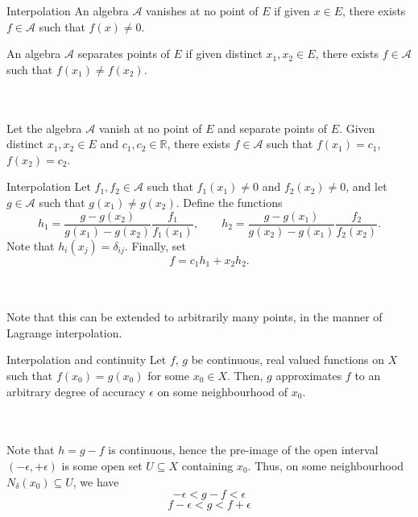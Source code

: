 \documentclass{beamer}
\def\R{\mathbb{R}}
\begin{document}
    \begin{frame}{Interpolation}
        An algebra $\mathscr{A}$ vanishes at no point of $E$ if given $x \in E$,
        there exists $f \in \mathscr{A}$ such that $f(x) \neq 0$.

        An algebra $\mathscr{A}$ separates points of $E$ if given distinct $x_1, x_2
        \in E$, there exists $f \in \mathscr{A}$ such that $f(x_1) \neq f(x_2)$.

        \\~\\

        Let the algebra $\mathscr{A}$ vanish at no point of $E$ and separate
        points of $E$. Given distinct $x_1, x_2 \in E$ and $c_1, c_2 \in \R$, there
        exists $f \in \mathscr{A}$ such that $f(x_1) = c_1$, $f(x_2) = c_2$.
    \end{frame}

    \begin{frame}{Interpolation}
        Let $f_1, f_2 \in \mathscr{A}$ such that $f_1(x_1) \neq 0$ and $f_2(x_2) \neq
        0$, and let $g \in \mathscr{A}$ such that $g(x_1) \neq g(x_2)$. Define the
        functions \[
            h_1 = \frac{g - g(x_2)}{g(x_1) - g(x_2)} \frac{f_1}{f_1(x_1)}, \qquad
            h_2 = \frac{g - g(x_1)}{g(x_2) - g(x_1)} \frac{f_2}{f_2(x_2)}.
        \] Note that $h_i(x_j) = \delta_{ij}$. Finally, set \[
            f = c_1 h_1 + x_2 h_2. \tag*{\qed}
        \] 

        \\~\\

        Note that this can be extended to arbitrarily many points, in the manner of
        Lagrange interpolation.
    \end{frame}

    \begin{frame}{Interpolation and continuity}
        Let $f$, $g$ be continuous, real valued functions on $X$ such that $f(x_0) =
        g(x_0)$ for some $x_0 \in X$. Then, $g$ approximates $f$ to an arbitrary
        degree of accuracy $\epsilon$ on some neighbourhood of $x_0$.

        \\~\\

        Note that $h = g - f$ is continuous, hence the pre-image of the open interval
        $(-\epsilon, +\epsilon)$ is some open set $U \subseteq X$ containing
        $x_0$. Thus, on some neighbourhood $N_\delta(x_0) \subseteq U$, we have \[
            -\epsilon < g - f < \epsilon
        \] \[
            f - \epsilon < g < f + \epsilon \tag*{\qed}
        \] 
    \end{frame}
\end{document}
